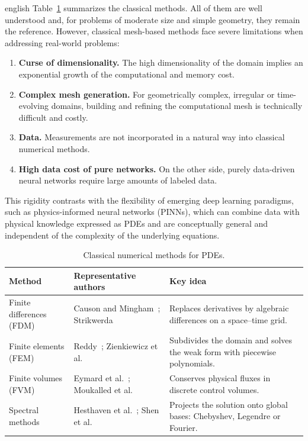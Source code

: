 \documentclass[0000.tex]{subfiles}
\begin{document}
\begin{hyphenrules}{english}
Table~\ref{tab:classical-methods} summarizes the classical methods. All of them are well understood and,
for problems of moderate size and simple geometry, they remain the reference. However, classical
mesh-based methods face severe limitations when addressing real-world problems:
\begin{enumerate}
  \item \textbf{Curse of dimensionality.} The high dimensionality of the domain implies an exponential
    growth of the computational and memory cost.
  \item \textbf{Complex mesh generation.} For geometrically complex, irregular or time-evolving domains,
    building and refining the computational mesh is technically difficult and costly.
  \item \textbf{Data.} Measurements are not incorporated in a natural way into classical numerical
    methods.
  \item \textbf{High data cost of pure networks.} On the other side, purely data-driven neural
    networks require large amounts of labeled data.
\end{enumerate}
This rigidity contrasts with the flexibility of emerging deep learning paradigms, such as
physics-informed neural networks (PINNs), which can combine data with physical knowledge expressed as
PDEs and are conceptually general and independent of the complexity of the underlying equations.

\begin{table}[htbp]
  \centering
  \caption{Classical numerical methods for PDEs.}
  \label{tab:classical-methods}
  \small
  \begin{tabularx}{\linewidth}{@{}lXX@{}}
    \toprule
    Method & Representative authors & Key idea \\
    \midrule
    Finite differences (FDM) & Causon and Mingham~\cite{causon2010}; Strikwerda~\cite{strikwerda2004} &
      Replaces derivatives by algebraic differences on a space--time grid. \\
    Finite elements (FEM) & Reddy~\cite{reddy2019}; Zienkiewicz et al.~\cite{zienkiewicz2013} &
      Subdivides the domain and solves the weak form with piecewise polynomials. \\
    Finite volumes (FVM) & Eymard et al.~\cite{eymard2000}; Moukalled et al.~\cite{moukalled2016} &
      Conserves physical fluxes in discrete control volumes. \\
    Spectral methods & Hesthaven et al.~\cite{hesthaven2007}; Shen et al.~\cite{shen2011} &
      Projects the solution onto global bases: Chebyshev, Legendre or Fourier. \\
    \bottomrule
  \end{tabularx}
\end{table}


\end{hyphenrules}
\end{document}
